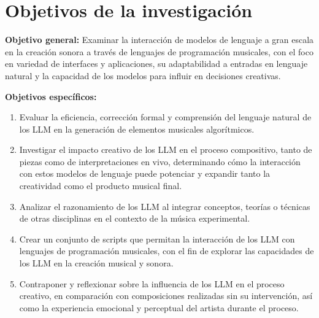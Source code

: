 \chapter{Objetivos de la investigación}


\textbf{Objetivo general:} Examinar la interacción de modelos de lenguaje a gran escala en la creación sonora a través de lenguajes de programación musicales, con el foco en variedad de interfaces y aplicaciones, su adaptabilidad a entradas en lenguaje natural y la capacidad de los modelos para influir en decisiones creativas.

\textbf{Objetivos específicos:}
\begin{enumerate}[label=\alph*)]
\item Evaluar la eficiencia, corrección formal y comprensión del lenguaje natural de los LLM en la generación de elementos musicales algorítmicos.
\item Investigar el impacto creativo de los LLM en el proceso compositivo, tanto de piezas como de interpretaciones en vivo, determinando cómo la interacción con estos modelos de lenguaje puede potenciar y expandir tanto la creatividad como el producto musical final.
\item Analizar el razonamiento de los LLM al integrar conceptos, teorías o técnicas de otras disciplinas en el contexto de la música experimental.
\item Crear un conjunto de scripts que permitan la interacción de los LLM con lenguajes de programación musicales, con el fin de explorar las capacidades de los LLM en la creación musical y sonora.
\item Contraponer y reflexionar sobre la influencia de los LLM en el proceso creativo, en comparación con composiciones realizadas sin su intervención, así como la experiencia emocional y perceptual del artista durante el proceso.
\end{enumerate}
